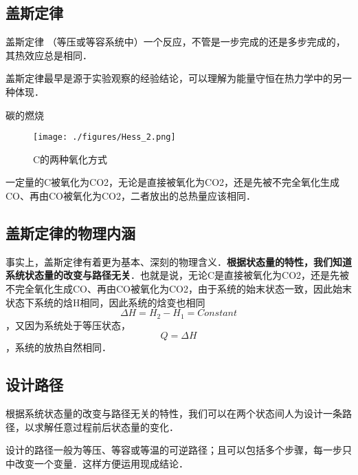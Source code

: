
\subsection{盖斯定律}
\begin{theorem}{盖斯定律}
（等压或等容系统中）一个反应，不管是一步完成的还是多步完成的，其热效应总是相同．
\end{theorem}
盖斯定律最早是源于实验观察的经验结论，可以理解为能量守恒在热力学中的另一种体现．

\begin{example}{碳的燃烧}
\begin{figure}[ht]
\centering
\texttt{[image: ./figures/Hess\_2.png]}
\caption{C的两种氧化方式} \label{Hess_fig2}
\end{figure}
一定量的C被氧化为CO2，无论是直接被氧化为CO2，还是先被不完全氧化生成CO、再由CO被氧化为CO2，二者放出的总热量应该相同．
\end{example}

\subsection{盖斯定律的物理内涵}
事实上，盖斯定律有着更为基本、深刻的物理含义．\textbf{根据状态量的特性，我们知道系统状态量的改变与路径无关}．也就是说，无论C是直接被氧化为CO2，还是先被不完全氧化生成CO、再由CO被氧化为CO2，由于系统的始末状态一致，因此始末状态下系统的焓H相同，因此系统的焓变也相同$$\Delta H=H_2-H_1=Constant$$，又因为系统处于等压状态，$$Q=\Delta H$$，系统的放热自然相同．

\subsection{设计路径}
根据系统状态量的改变与路径无关的特性，我们可以在两个状态间人为设计一条路径，以求解任意过程前后状态量的变化．

设计的路径一般为等压、等容或等温的可逆路径；且可以包括多个步骤，每一步只中改变一个变量．这样方便运用现成结论．

